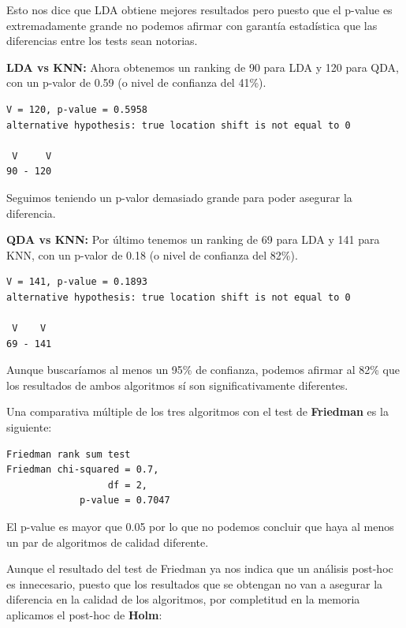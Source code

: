 Esto nos dice que LDA obtiene mejores resultados pero puesto que el p-value es extremadamente grande no podemos afirmar con garantía estadística que las diferencias entre los tests sean notorias.

\vspace{\baselineskip}

\textbf{LDA vs KNN:} Ahora obtenemos un ranking de 90 para LDA y 120 para QDA, con un p-valor de 0.59 (o nivel de confianza del 41\%).
\begin{verbatim}
V = 120, p-value = 0.5958
alternative hypothesis: true location shift is not equal to 0

 V     V
90 - 120 
\end{verbatim}

Seguimos teniendo un p-valor demasiado grande para poder asegurar la diferencia.

\vspace{\baselineskip}

\textbf{QDA vs KNN:} Por último tenemos un ranking de 69 para LDA y 141 para KNN, con un p-valor de 0.18 (o nivel de confianza del 82\%).
\begin{verbatim}
V = 141, p-value = 0.1893
alternative hypothesis: true location shift is not equal to 0

 V    V
69 - 141
\end{verbatim}

Aunque buscaríamos al menos un 95\% de confianza, podemos afirmar al 82\% que los resultados de ambos algoritmos sí son significativamente diferentes.

\vspace{\baselineskip}
\vspace{\baselineskip}

Una comparativa múltiple de los tres algoritmos con el test de \textbf{Friedman} es la siguiente:

\begin{verbatim}
Friedman rank sum test
Friedman chi-squared = 0.7, 
                  df = 2, 
             p-value = 0.7047
\end{verbatim}

El p-value es mayor que 0.05 por lo que no podemos concluir que haya al menos un par de algoritmos de calidad diferente.

\vspace{\baselineskip}
\vspace{\baselineskip}

Aunque el resultado del test de Friedman ya nos indica que un análisis post-hoc es innecesario, puesto que los resultados que se obtengan no van a asegurar la diferencia en la calidad de los algoritmos, por completitud en la memoria aplicamos el post-hoc de \textbf{Holm}:

